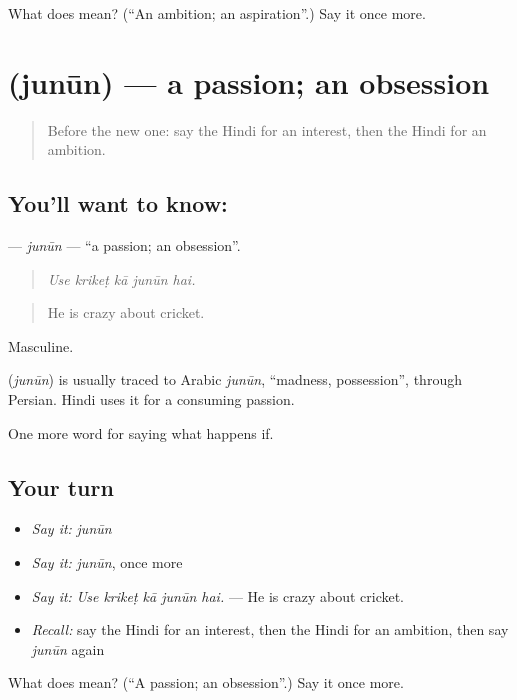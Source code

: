\begin{tcolorbox}[breakable,colback=teal!4,colframe=teal!35!black,title={Before you move on}]
What does  mean? (\textquotedblleft{}An ambition; an aspiration\textquotedblright{}.) Say it once more.
\end{tcolorbox}
\section[\texorpdfstring{\hi{जुनून} (junūn)}{जुनून (junūn)}]{ (junūn) — a passion; an obsession}

\label{lesson:HI-C558-junun}



\begin{quote}
Before the new one: say the Hindi for an interest, then the Hindi for an ambition.
\end{quote}

\subsection*{You'll want to know: }
\textbf{} — \emph{junūn} — \textquotedblleft{}a passion; an obsession\textquotedblright{}.

\begin{quote}
    
\end{quote}

\begin{quote}
\emph{Use krikeṭ kā junūn hai.}
\end{quote}

\begin{quote}
He is crazy about cricket.
\end{quote}

Masculine.

\begin{cousinweb}
\textbf{} (\emph{junūn}) is usually traced to Arabic \emph{junūn}, \textquotedblleft{}madness, possession\textquotedblright{}, through Persian. Hindi uses it for a consuming passion.
\end{cousinweb}

\begin{grammarlens}[title={What you've built}]
One more word for saying what happens if.
\end{grammarlens}

\subsection*{Your turn}
\begin{itemize}
\raggedright
  \item \emph{Say it:} \emph{junūn}
  \item \emph{Say it:} \emph{junūn}, once more
  \item \emph{Say it:} \emph{Use krikeṭ kā junūn hai.} — He is crazy about cricket.
  \item \emph{Recall:} say the Hindi for an interest, then the Hindi for an ambition, then say \emph{junūn} again
\end{itemize}

\begin{tcolorbox}[breakable,colback=teal!4,colframe=teal!35!black,title={Before you move on}]
What does  mean? (\textquotedblleft{}A passion; an obsession\textquotedblright{}.) Say it once more.
\end{tcolorbox}
